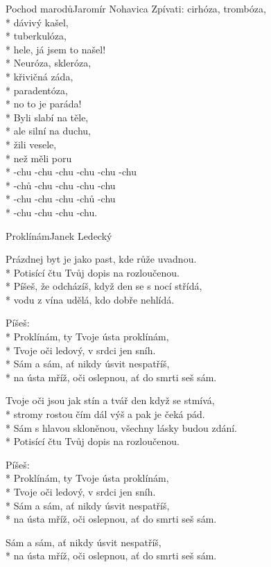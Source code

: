 \documentclass[10.5pt]{book}
\begin{document}
\begin{poem}{Pochod marodů}{Jaromír Nohavica}
Zpívati: cirhóza, trombóza,\\*
dávivý kašel,\\*
tuberkulóza,\\*
hele, já jsem to našel!\\*
Neuróza, skleróza,\\*
křivičná záda,\\*
paradentóza,\\*
no to je paráda!\\*
Byli slabí na těle,\\*
ale silní na duchu,\\*
žili vesele,\\*
než měli poru\\*
-chu -chu -chu -chu -chu -chu\\*
-chů -chu -chu -chu -chu\\*
-chu -chu -chu -chů -chu\\*
-chu -chu -chu -chu.

\end{poem}

\begin{poem}{Proklínám}{Janek Ledecký}

\settowidth{\versewidth}{Sám s hlavou skloněnou, všechny lásky budou zdání.}

Prázdnej byt je jako past, kde růže uvadnou.\\*
Potisící čtu Tvůj dopis na rozloučenou.\\*
Píšeš, že odcházíš, když den se s nocí střídá,\\*
vodu z vína udělá, kdo dobře nehlídá.

Píšeš:\\*
Proklínám, ty Tvoje ústa proklínám,\\*
Tvoje oči ledový, v srdci jen sníh.\\*
Sám a sám, ať nikdy úsvit nespatříš,\\*
na ústa mříž, oči oslepnou, ať do smrti seš sám.

Tvoje oči jsou jak stín a tvář den když se stmívá,\\*
stromy rostou čím dál výš a pak je čeká pád.\\*
Sám s hlavou skloněnou, všechny lásky budou zdání.\\*
Potisící čtu Tvůj dopis na rozloučenou.

Píšeš:\\*
Proklínám, ty Tvoje ústa proklínám,\\*
Tvoje oči ledový, v srdci jen sníh.\\*
Sám a sám, ať nikdy úsvit nespatříš,\\*
na ústa mříž, oči oslepnou, ať do smrti seš sám.

Sám a sám, ať nikdy úsvit nespatříš,\\*
na ústa mříž, oči oslepnou, ať do smrti seš sám.

\end{poem}
\end{document}
